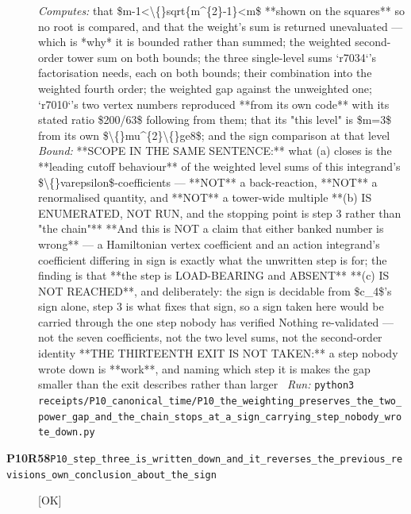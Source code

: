 \begin{description}
\emph{Computes:} that \$m-1<\textbackslash\{\}sqrt\{m\textasciicircum{}\{2\}-1\}<m\$ **shown on the squares** so no root is compared, and that the weight's sum is returned unevaluated --- which is *why* it is bounded rather than summed; the weighted second-order tower sum on both bounds; the three single-level sums `r7034`'s factorisation needs, each on both bounds; their combination into the weighted fourth order; the weighted gap against the unweighted one; `r7010`'s two vertex numbers reproduced **from its own code** with its stated ratio \$200/63\$ following from them; that its "this level" is \$m=3\$ from its own \$\textbackslash\{\}mu\textasciicircum{}\{2\}\textbackslash\{\}ge8\$; and the sign comparison at that level
 \emph{Bound:}  **SCOPE IN THE SAME SENTENCE:** what (a) closes is the **leading cutoff behaviour** of the weighted level sums of this integrand's \$\textbackslash\{\}varepsilon\$-coefficients --- **NOT** a back-reaction, **NOT** a renormalised quantity, and **NOT** a tower-wide multiple  **(b) IS ENUMERATED, NOT RUN, and the stopping point is step 3 rather than "the chain"**  **And this is NOT a claim that either banked number is wrong** --- a Hamiltonian vertex coefficient and an action integrand's coefficient differing in sign is exactly what the unwritten step is for; the finding is that **the step is LOAD-BEARING and ABSENT**  **(c) IS NOT REACHED**, and deliberately: the sign is decidable from \$c\_4\$'s sign alone, step 3 is what fixes that sign, so a sign taken here would be carried through the one step nobody has verified  Nothing re-validated --- not the seven coefficients, not the two level sums, not the second-order identity  **THE THIRTEENTH EXIT IS NOT TAKEN:** a step nobody wrote down is **work**, and naming which step it is makes the gap smaller than the exit describes rather than larger
\ \emph{Run:} \texttt{python3 receipts/P10\_canonical\_time/P10\_the\_weighting\_preserves\_the\_two\_power\_gap\_and\_the\_chain\_stops\_at\_a\_sign\_carrying\_step\_nobody\_wrote\_down.py}
\item[\rcptlabel{P10_step_three_is_written_down_and_it_reverses_the_previous_revisions_own_conclusion_about_the_sign}{P10R58}\textbf{P10R58}\quad\texttt{P10\_step\_three\_is\_written\_down\_and\_it\_reverses\_the\_previous\_revisions\_own\_conclusion\_about\_the\_sign}]\hfill\textsf{[OK]}\\

\end{description}

